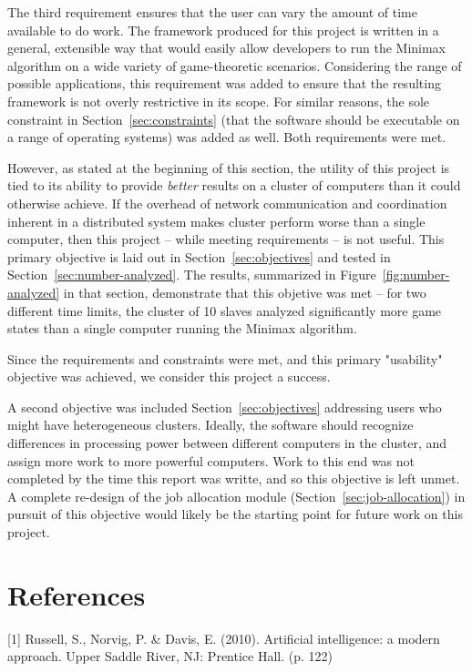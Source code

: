 \documentclass[pdftex,12pt,a4paper]{article}
\begin{document}
The third requirement ensures that the user can vary the amount of time available to do work. The framework produced for this project is written in a general, extensible way that would easily allow developers to run the Minimax algorithm on a wide variety of game-theoretic scenarios. Considering the range of possible applications, this requirement was added to ensure that the resulting framework is not overly restrictive in its scope. For similar reasons, the sole constraint in Section~\ref{sec:constraints} (that the software should be executable on a range of operating systems) was added as well. Both requirements were met.

However, as stated at the beginning of this section, the utility of this project is tied to its ability to provide \emph{better} results on a cluster of computers than it could otherwise achieve. If the overhead of network communication and coordination inherent in a distributed system makes cluster perform worse than a single computer, then this project -- while meeting requirements -- is not useful. This primary objective is laid out in Section~\ref{sec:objectives} and tested in Section~\ref{sec:number-analyzed}. The results, summarized in Figure~\ref{fig:number-analyzed} in that section, demonstrate that this objetive was met -- for two different time limits, the cluster of 10 slaves analyzed significantly more game states than a single computer running the Minimax algorithm.

Since the requirements and constraints were met, and this primary "usability" objective was achieved, we consider this project a success. 

A second objective was included Section~\ref{sec:objectives} addressing users who might have heterogeneous clusters. Ideally, the software should recognize differences in processing power between different computers in the cluster, and assign more work to more powerful computers. Work to this end was not completed by the time this report was writte, and so this objective is left unmet. A complete re-design of the job allocation module (Section~\ref{sec:job-allocation}) in pursuit of this objective would likely be the starting point for future work on this project.

%
%
\pagebreak
\section{References}

[1] Russell, S., Norvig, P. \& Davis, E. (2010). Artificial intelligence: a modern approach. Upper Saddle River, NJ: Prentice Hall. (p. 122)
\end{document}
